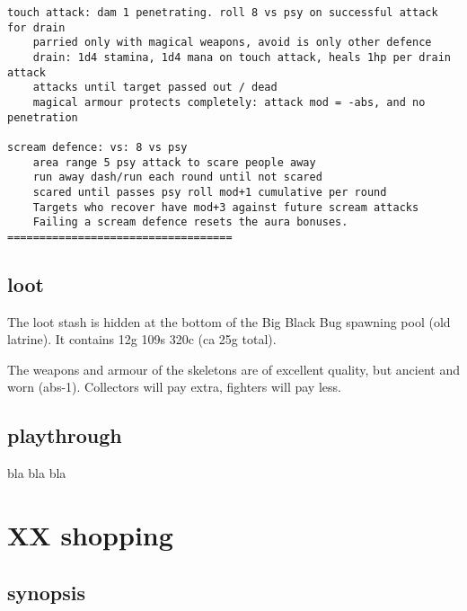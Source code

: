 \begin{description}
\begin{samepage}
\begin{verbatim}
touch attack: dam 1 penetrating. roll 8 vs psy on successful attack for drain
    parried only with magical weapons, avoid is only other defence
    drain: 1d4 stamina, 1d4 mana on touch attack, heals 1hp per drain attack
    attacks until target passed out / dead
    magical armour protects completely: attack mod = -abs, and no penetration

scream defence: vs: 8 vs psy
    area range 5 psy attack to scare people away
    run away dash/run each round until not scared
    scared until passes psy roll mod+1 cumulative per round
    Targets who recover have mod+3 against future scream attacks
    Failing a scream defence resets the aura bonuses.
===================================
\end{verbatim} \normalsize \end{samepage}

\end{description}


\subsection*{loot}

The loot stash is hidden at the bottom of the Big Black Bug spawning pool (old latrine). It contains 12g 109s 320c (ca 25g total).

The weapons and armour of the skeletons are of excellent quality, but ancient and worn (abs-1). Collectors will pay extra, fighters will pay less.


\subsection*{playthrough}

bla bla bla







\newpage
\section*{XX shopping}


\subsection*{synopsis}

